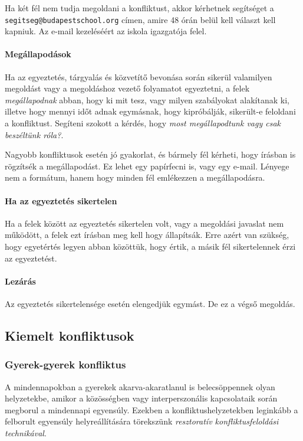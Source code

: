 Ha két fél nem tudja megoldani a konfliktust, akkor kérhetnek segítséget a \texttt{segitseg@budapestschool.org} címen, amire 48 órán belül kell választ kell kapniuk. Az e-mail kezeléséért az iskola igazgatója felel.

\paragraph{Megállapodások}

Ha az egyeztetés, tárgyalás és közvetítő bevonása során sikerül valamilyen megoldást vagy a megoldáshoz vezető folyamatot egyeztetni, a felek \emph{megállapodnak} abban, hogy ki mit tesz, vagy milyen szabályokat alakítanak ki, illetve hogy mennyi időt adnak egymásnak, hogy kipróbálják, sikerült-e feloldani a konfliktust. Segíteni szokott a kérdés, hogy \emph{most megállapodtunk vagy csak beszéltünk róla?}.

Nagyobb konfliktusok esetén jó gyakorlat, és bármely fél kérheti, hogy írásban is rögzítsék a megállapodást. Ez lehet egy papírfecni is, vagy egy e-mail. Lényege nem a formátum, hanem  hogy minden fél emlékezzen a megállapodásra.

\paragraph{Ha az egyeztetés sikertelen}

Ha a felek között az egyeztetés sikertelen volt, vagy a megoldási javaslat nem működött, a felek ezt írásban meg kell hogy állapítsák. Erre azért van szükség, hogy egyetértés legyen abban közöttük, hogy értik, a másik fél sikertelennek érzi az egyeztetést.

\paragraph{Lezárás}

Az egyeztetés sikertelensége esetén elengedjük egymást. De ez a végső megoldás.

\subsection{Kiemelt konfliktusok}

\subsubsection{Gyerek-gyerek konfliktus}

A mindennapokban a gyerekek akarva-akaratlanul is
belecsöppennek\linebreak
olyan helyzetekbe, amikor a közösségben vagy interperszonális kapcsolataik során megborul a mindennapi egyensúly. Ezekben a konfliktushelyzetekben leginkább a felborult egyensúly helyreállítására törekszünk \emph{resztoratív konfliktusfeloldási technikával}.

